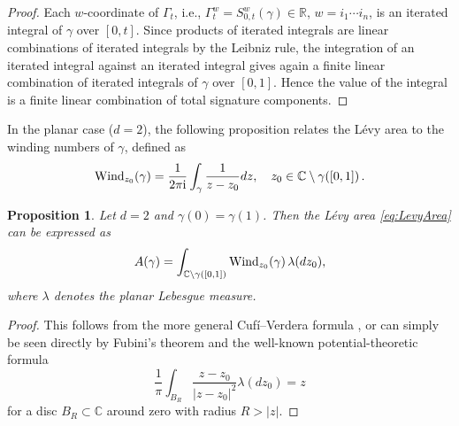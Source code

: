 \documentclass[11pt]{article}
\newcommand{\val}[1]{\textcolor{blue}{#1}}
\newtheorem{proposition}[theorem]{Proposition}
\theoremstyle{definition}
\newcommand{\R}{\mathbb{R}}
\begin{document}
\begin{proof}
Each $w$-coordinate of $\Gamma_t$, i.e., $\Gamma_t^w = S^w_{0,t}(\gamma) \in \R$, $w = i_1\cdots i_n$,
is an iterated integral of $ \gamma $ over $[0,t] $. Since products of iterated integrals are linear combinations of iterated integrals by the Leibniz rule, the integration of an iterated integral against an iterated integral gives again a finite linear combination of iterated integrals of $ \gamma $ over $ [0,1] $. Hence the value of the integral is a finite linear combination of total signature components.
\end{proof}




In the planar case ($d = 2$), the following proposition relates the Lévy area to the winding numbers of $\gamma$, defined as  
$$\textnormal{Wind}_{z_0}(\gamma) = \frac{1}{2 \pi \mathrm{i}} \int_{\gamma} \frac{1}{z-z_0} d z , \quad z_0 \in \mathbb{C} \setminus \gamma([0,1]) \, .$$
\begin{proposition}\label{prop:levyarea_winding}
Let $d=2$ and $\gamma(0)=\gamma(1)$. Then the Lévy area \eqref{eq:LevyArea} can be expressed as  
\begin{equation}\label{eq:LevyvsWinding}
    A(\gamma) = \int_{\mathbb{C} \setminus \gamma([0,1])}  \textnormal{Wind}_{z_0}(\gamma) \, \lambda(dz_0),
\end{equation}
where $\lambda$ denotes the planar Lebesgue measure. 
\end{proposition}
\begin{proof}
This follows from the more general Cufí--Verdera  formula  \cite[Theorem 1]{CV2015}, or can simply be seen directly by Fubini's theorem and the well-known potential-theoretic formula
$$
\frac{1}{\pi} \int_{B_R} \frac{z-z_0}{{|z-z_0|}^2} \lambda(dz_0)  = z
$$
for a disc $B_R \subset \mathbb{C}$ around zero with radius $ R > |z|$.
\end{proof}
\end{document}
